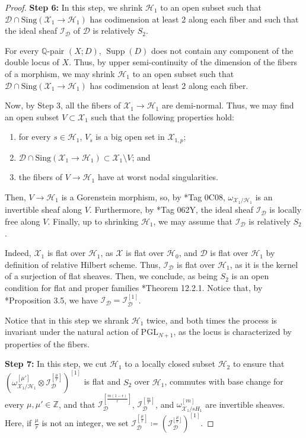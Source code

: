 \documentclass{amsart}
\newcommand{\bQ}{\mathbb{Q}}
\newcommand{\bZ}{\mathbb{Z}}
\newcommand{\sD}{\mathscr{D}}
\newcommand{\sH}{\mathscr{H}}
\newcommand{\sI}{\mathscr{I}}
\newcommand{\sX}{\mathscr{X}}
\newcommand{\supp}{\operatorname{Supp}}
\theoremstyle{definition}
\newcommand{\rar}{\rightarrow}
\begin{document}
\begin{proof}
{\bf Step 6:} In this step, we shrink $\sH_1$ to an open subset such that $\sD \cap \mathrm{Sing}(\sX_1 \rar \sH_1)$ has codimension at least 2 along each fiber and such that the ideal sheaf $\sI_\sD$ of $\sD$ is relatively $S_2$.

For every $\bQ$-pair $(X;D)$, $\supp(D)$ does not contain any component of the double locus of $X$.
Thus, by upper semi-continuity of the dimension of the fibers of a morphism, we may shrink $\sH_1$ to an open subset such that $\sD \cap \mathrm{Sing}(\sX_1 \rar \sH_1)$ has codimension at least 2 along each fiber.

Now, by Step 3, all the fibers of $\sX_1 \rar \sH_1$ are demi-normal.
Thus, we may find an open subset $V \subset \sX_1$ such that the following properties hold:
\begin{enumerate}
    \item for every $s \in \sH_1$, $V_s$ is a big open set in $\sX_{1,p}$;
    \item $\sD \cap \mathrm{Sing}(\sX_1 \rar \sH_1) \subset \sX_1 \setminus V$; and
    \item the fibers of $V \rar \sH_1$ have at worst nodal singularities.
\end{enumerate}
Then, $V \rar \sH_1$ is a Gorenstein morphism, so, by \cite{stacks-project}*{Tag 0C08}, $\omega_{\sX_1/\sH_1}$ is an invertible sheaf along $V$.
Furthermore, by \cite{stacks-project}*{Tag 062Y}, the ideal sheaf $\sI_\sD$ is locally free along $V$.
Finally, up to shrinking $\sH_1$, we may assume that $\sI_\sD$ is relatively $S_2$.

Indeed, $\sX_1$ is flat over $\sH_1$, as $\sX$ is flat over $\sH_0$, and $\sD$ is flat over $\sH_1$ by definition of relative Hilbert scheme.
Thus, $\sI_\sD$ is flat over $\sH_1$, as it is the kernel of a surjection of flat sheaves.
Then, we conclude, as being $S_2$ is an open condition for flat and proper families \cite{EGAIV}*{Theorem 12.2.1}.
Notice that, by \cite{HK04}*{Proposition 3.5}, we have $\sI_\sD=\sI_\sD^{[1]}$.

Notice that in this step we shrank $\sH_1$ twice, and both times the process is invariant under the natural action of $\mathrm{PGL}_{N+1}$, as the locus is characterized by properties of the fibers.

{\bf Step 7:} In this step, we cut $\sH_1$ to a locally closed subset $\sH_2$ to ensure that $(\omega_{\sX_1/\sH_1}^{[\mu']}\otimes\sI_\sD^{[\frac{\mu}{r}]})^{[1]}$ is flat and $S_2$ over $\sH_1$, commutes with base change for every $\mu,\mu'\in \bZ$, and that $\sI_\sD^{[\frac{m(1-\epsilon)}{r}]}$, $\sI_\sD^{[\frac{m}{r}]}$, and $\omega_{\sX_1/sH_1}^{[m]}$ are invertible sheaves.
Here, if $\frac{\mu}{r}$ is not an integer, we set $\sI_\sD^{[\frac{\mu}{r}]} \coloneqq  \left(\sI_\sD^{\lfloor\frac{\mu}{r}\rfloor}\right)^{[1]}$.



\end{proof}
\end{document}
